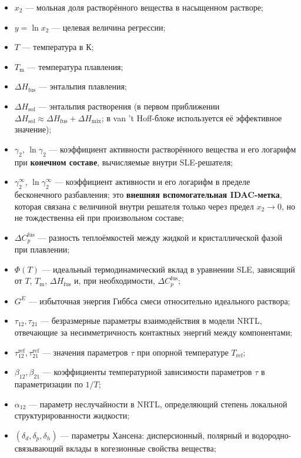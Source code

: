 \documentclass[11pt]{article}
\begin{document}
\begin{itemize}
  \item $x_2$ --- мольная доля растворённого вещества в насыщенном растворе;
  \item $y=\ln x_2$ --- целевая величина регрессии;
  \item $T$ --- температура в К;
  \item $T_{\mathrm{m}}$ --- температура плавления;
  \item $\Delta H_{\mathrm{fus}}$ --- энтальпия плавления;
  \item $\Delta H_{\mathrm{sol}}$ --- энтальпия растворения (в первом приближении $\Delta H_{\mathrm{sol}}\approx\Delta H_{\mathrm{fus}}+\Delta H_{\mathrm{mix}}$; в van 't Hoff-блоке используется её эффективное значение);
  \item $\gamma_2$, $\ln\gamma_2$ --- коэффициент активности растворённого вещества и его логарифм при \textbf{конечном составе}, вычисляемые внутри SLE-решателя;
  \item $\gamma_2^{\infty}$, $\ln\gamma_2^{\infty}$ --- коэффициент активности и его логарифм в пределе бесконечного разбавления; это \textbf{внешняя вспомогательная IDAC-метка}, которая связана с величиной внутри решателя только через предел $x_2\to 0$, но не тождественна ей при произвольном составе;
  \item $\Delta C_p^{\mathrm{fus}}$ --- разность теплоёмкостей между жидкой и кристаллической фазой при плавлении;
  \item $\Phi(T)$ --- идеальный термодинамический вклад в уравнении SLE, зависящий от $T$, $T_{\mathrm{m}}$, $\Delta H_{\mathrm{fus}}$ и, при необходимости, $\Delta C_p^{\mathrm{fus}}$;
  \item $G^E$ --- избыточная энергия Гиббса смеси относительно идеального раствора;
  \item $\tau_{12}, \tau_{21}$ --- безразмерные параметры взаимодействия в модели NRTL, отвечающие за несимметричность контактных энергий между компонентами;
  \item $\tau_{12}^{\mathrm{ref}}, \tau_{21}^{\mathrm{ref}}$ --- значения параметров $\tau$ при опорной температуре $T_{\mathrm{ref}}$;
  \item $\beta_{12}, \beta_{21}$ --- коэффициенты температурной зависимости параметров $\tau$ в параметризации по $1/T$;
  \item $\alpha_{12}$ --- параметр неслучайности в NRTL, определяющий степень локальной структурированности жидкости;
  \item $(\delta_d,\delta_p,\delta_h)$ --- параметры Хансена: дисперсионный, полярный и водородно-связывающий вклады в когезионные свойства вещества;

\end{itemize}
\end{document}
